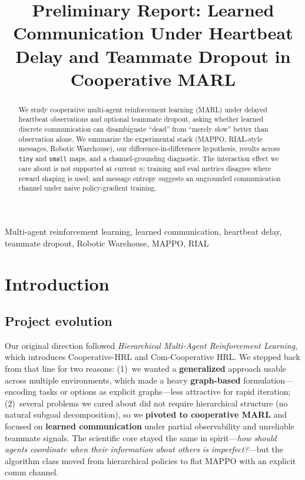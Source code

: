 \documentclass[conference,onecolumn]{IEEEtran}
\title{Preliminary Report: Learned Communication Under Heartbeat Delay and Teammate Dropout in Cooperative MARL}
\author{\IEEEauthorblockN{Praneel Khiantani}
\IEEEauthorblockA{\textit{Harvard University}\\
Cambridge, MA, USA\\
Course: CS 2860 (Multi-Agent Systems)}
\and
\IEEEauthorblockN{Sam Chen}
\IEEEauthorblockA{\textit{Harvard University}\\
Cambridge, MA, USA\\
Course: CS 2860 (Multi-Agent Systems)}
}
\begin{document}
\maketitle

\begin{abstract}
We study cooperative multi-agent reinforcement learning (MARL) under delayed heartbeat observations and optional teammate dropout, asking whether learned discrete communication can disambiguate ``dead'' from ``merely slow'' better than observation alone. We summarize the experimental stack (MAPPO, RIAL-style messages, Robotic Warehouse), our difference-in-differences hypothesis, results across \texttt{tiny} and \texttt{small} maps, and a channel-grounding diagnostic. The interaction effect we care about is not supported at current $n$; training and eval metrics disagree where reward shaping is used; and message entropy suggests an ungrounded communication channel under naive policy-gradient training.
\end{abstract}

\begin{IEEEkeywords}
Multi-agent reinforcement learning, learned communication, heartbeat delay, teammate dropout, Robotic Warehouse, MAPPO, RIAL
\end{IEEEkeywords}

\section{Introduction}

\subsection{Project evolution}

Our original direction followed \emph{Hierarchical Multi-Agent Reinforcement Learning}, which introduces Cooperative-HRL and Com-Cooperative HRL. We stepped back from that line for two reasons: (1)~we wanted a \textbf{generalized} approach usable across multiple environments, which made a heavy \textbf{graph-based} formulation---encoding tasks or options as explicit graphs---less attractive for rapid iteration; (2)~several problems we cared about did not require hierarchical structure (no natural subgoal decomposition), so we \textbf{pivoted to cooperative MARL} and focused on \textbf{learned communication} under partial observability and unreliable teammate signals. The scientific core stayed the same in spirit---\emph{how should agents coordinate when their information about others is imperfect?}---but the algorithm class moved from hierarchical policies to flat MAPPO with an explicit comm channel.
\end{document}

